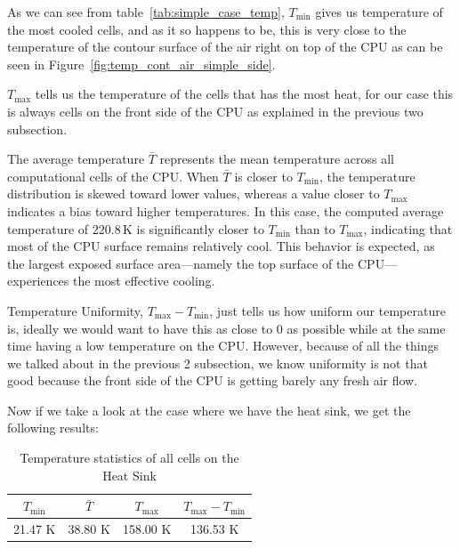 \documentclass[a4paper, 10pt]{article}
\begin{document}
			\noindent As we can see from table~\ref{tab:simple_case_temp}, $T_\min$ gives us temperature of the most cooled cells, and as it so happens to be, this is very close to the temperature
			of the contour surface of the air right on top of the CPU as can be seen in Figure~\ref{fig:temp_cont_air_simple_side}. \newline

			\noindent $T_\max$ tells us the temperature of the cells that has the most heat, for our case this is always cells on the front side of the CPU
			as explained in the previous two subsection. \newline

			\noindent The average temperature $\bar{T}$ represents the mean temperature across all computational cells of the CPU.
			When $\bar{T}$ is closer to $T_{\min}$, the temperature distribution is skewed toward lower values, whereas a value closer to $T_{\max}$ indicates a bias toward higher temperatures.
			In this case, the computed average temperature of $220.8\,\text{K}$ is significantly closer to $T_{\min}$ than to $T_{\max}$, indicating that most of the CPU surface remains relatively cool.
	 		This behavior is expected, as the largest exposed surface area—namely the top surface of the CPU—experiences the most effective cooling.\newline

			\noindent Temperature Uniformity, $T_{\max} - T_{\min}$, just tells us how uniform our temperature is, ideally we would want to have this as close to 0 as possible while at the same time having a low temperature on the CPU.
			However, because of all the things we talked about in the previous 2 subsection, we know uniformity is not that good because the front side of the CPU is getting barely any fresh air flow. \newline

			\noindent Now if we take a look at the case where we have the heat sink, we get the following results:
			\begin{table}[h!]
				\centering
				\begin{tabular}{|c|c|c|c|}
					\toprule
					\textbf{$T_{\min}$} & \textbf{$\bar{T}$} & \textbf{$T_{\max}$} & \textbf{$T_{\max} - T_{\min}$} \\
					\midrule
					21.47 K & 38.80 K & 158.00 K & 136.53 K \\
					\bottomrule
				\end{tabular}
				\caption{Temperature statistics of all cells on the Heat Sink}
				\label{tab:advance_case_temp}
			\end{table}
\end{document}

